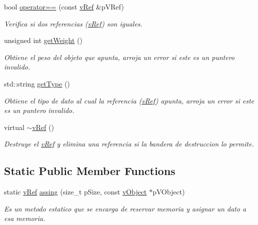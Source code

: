 \begin{DoxyCompactItemize}
bool \hyperlink{classv_ref_a67f7a5cc022f60bfe5a6d1069d97a455}{operator==} (const \hyperlink{classv_ref}{v\-Ref} \&p\-V\-Ref)
\begin{DoxyCompactList}\small\item\em Verifica si dos referencias (\hyperlink{classv_ref}{v\-Ref}) son iguales. \end{DoxyCompactList}\item 
unsigned int \hyperlink{classv_ref_a82bfa187c785c2044dde59aa8d993c6a}{get\-Weight} ()
\begin{DoxyCompactList}\small\item\em Obtiene el peso del objeto que apunta, arroja un error si este es un puntero invalido. \end{DoxyCompactList}\item 
std\-::string \hyperlink{classv_ref_a29f102a40b30f7662de769fd07f42f0c}{get\-Type} ()
\begin{DoxyCompactList}\small\item\em Obtiene el tipo de dato al cual la referencia (\hyperlink{classv_ref}{v\-Ref}) apunta, arroja un error si este es un puntero invalido. \end{DoxyCompactList}\item 
\hypertarget{classv_ref_a0c2e8271f53598dc7ba931db2b7a182d}{virtual \hyperlink{classv_ref_a0c2e8271f53598dc7ba931db2b7a182d}{$\sim$v\-Ref} ()}\label{classv_ref_a0c2e8271f53598dc7ba931db2b7a182d}

\begin{DoxyCompactList}\small\item\em Destruye el \hyperlink{classv_ref}{v\-Ref} y elimina una referencia si la bandera de destruccion lo permite. \end{DoxyCompactList}\end{DoxyCompactItemize}
\subsection*{Static Public Member Functions}
\begin{DoxyCompactItemize}
\item 
static \hyperlink{classv_ref}{v\-Ref} \hyperlink{classv_ref_aa3ac4bab0c6cea635768dbfe40dc1284}{assing} (size\-\_\-t p\-Size, const \hyperlink{classv_object}{v\-Object} $\ast$p\-V\-Object)
\begin{DoxyCompactList}\small\item\em Es un metodo estatico que se encarga de reservar memoria y asignar un dato a esa memoria. \end{DoxyCompactList}\end{DoxyCompactItemize}
